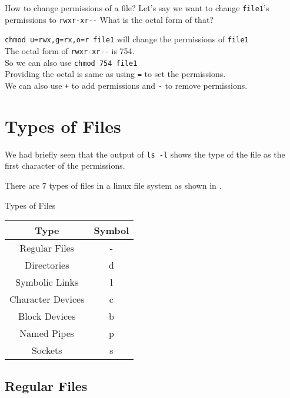 \begin{qs}
  How to change permissions of a file?
  Let's say we want to change \lstinline|file1|'s permissions to \lstinline|rwxr-xr--|
  What is the octal form of that?
\end{qs}

\begin{ans}
  \lstinline|chmod u=rwx,g=rx,o=r file1| will change the permissions of \lstinline|file1|\\
  The octal form of \lstinline|rwxr-xr--| is 754.\\
  So we can also use \lstinline|chmod 754 file1|\\
  Providing the octal is same as using \lstinline|=| to set the permissions.\\
  We can also use \lstinline|+| to add permissions and \lstinline|-| to remove permissions.
\end{ans}


\vfill
\pagebreak
\section{Types of Files}

We had briefly seen that the output of \lstinline|ls -l| shows the type of the file as the first character of the permissions.

There are 7 types of files in a linux file system as shown in .

\begin{margintable}
\caption{Types of Files}
\begin{tabular}{ c c }
  \toprule
  Type & Symbol \\
 \midrule
  Regular Files & -{} \\
  Directories & d \\
  Symbolic Links & l \\
  Character Devices & c \\
  Block Devices & b \\
  Named Pipes & p \\
  Sockets & s \\
 \bottomrule
\end{tabular}
\end{margintable}

\subsection{Regular Files}

